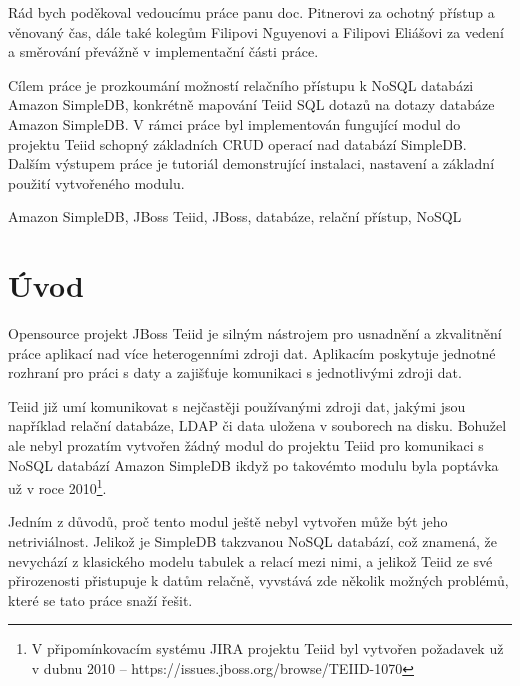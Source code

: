 \documentclass[oneside,12pt]{fithesis2}
\begin{document}
  
\VerbatimFootnotes
\FrontMatter  
\ThesisTitlePage  

\setcounter{page}{1} 

\begin{ThesisDeclaration}  
\DeclarationText  
\AdvisorName  
\end{ThesisDeclaration}   

\begin{ThesisThanks}  
Rád bych poděkoval vedoucímu práce panu doc. Pitnerovi za ochotný přístup a věnovaný čas, dále také kolegům Filipovi Nguyenovi a Filipovi Eliášovi za vedení a směrování převážně v implementační části práce.
\end{ThesisThanks}  
 
\begin{ThesisAbstract}  
Cílem práce je prozkoumání možností relačního přístupu k NoSQL databázi Amazon SimpleDB, konkrétně mapování Teiid SQL dotazů na dotazy databáze Amazon SimpleDB. V rámci práce byl implementován fungující modul do projektu Teiid schopný základních CRUD operací nad databází SimpleDB. Dalším výstupem práce je tutoriál demonstrující instalaci, nastavení a základní použití vytvořeného modulu.
\end{ThesisAbstract}  
 
\begin{ThesisKeyWords}  
Amazon SimpleDB, JBoss Teiid, JBoss, databáze, relační přístup, NoSQL
\end{ThesisKeyWords}  
 
\MainMatter

\tableofcontents   
\chapter{Úvod}
Opensource projekt JBoss Teiid je silným nástrojem pro usnadnění a zkvalitnění práce aplikací nad více heterogenními zdroji dat. Aplikacím poskytuje jednotné rozhraní pro práci s daty a zajišťuje komunikaci s jednotlivými zdroji dat. 

Teiid již umí komunikovat s nejčastěji používanými zdroji dat, jakými jsou například relační databáze, LDAP či data uložena v souborech na disku. Bohužel ale nebyl prozatím vytvořen žádný modul do projektu Teiid pro komunikaci s NoSQL databází Amazon SimpleDB ikdyž po takovémto modulu byla poptávka už v roce 2010\footnote{V připomínkovacím systému JIRA projektu Teiid byl vytvořen požadavek už v dubnu 2010 -- https://issues.jboss.org/browse/TEIID-1070}. 

Jedním z důvodů, proč tento modul ještě nebyl vytvořen může být jeho netriviálnost. Jelikož je SimpleDB takzvanou NoSQL databází, což znamená, že nevychází z klasického modelu tabulek a relací mezi nimi, a jelikož Teiid ze své přirozenosti přistupuje k datům relačně, vyvstává zde několik možných problémů, které se tato práce snaží řešit.
\end{document}
